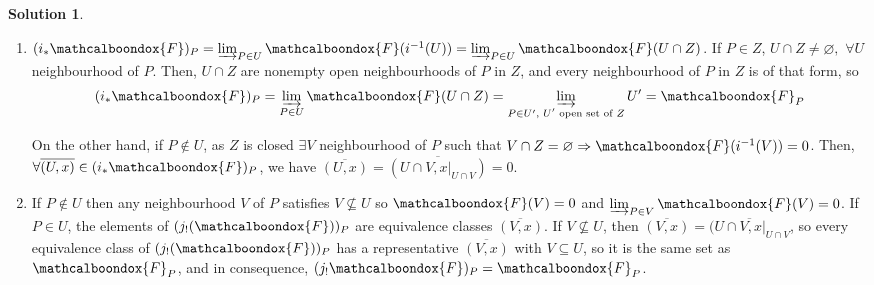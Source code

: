 \documentclass[12pt]{article}
\newcommand{\imp}{\ensuremath{\Rightarrow}}
\theoremstyle{definition}
\newtheorem*{sol}{Solution}
\newcommand{\sF}{\ensuremath{\mathcalboondox{F}}}
\begin{document}
\begin{sol}
	\begin{enumerate}[label=\alph*)]
		\item $(i_{*}\sF)_P = \varinjlim_{P \in U} \sF(i^{-1}(U)) = \varinjlim_{P \in U} \sF(U \cap Z)$. If $P \in Z$, $U \cap Z \neq \varnothing, \, \, \forall U$ neighbourhood of $P$. Then, $U \cap Z$ are nonempty open neighbourhoods of $P$ in $Z$, and every neighbourhood of $P$ in $Z$ is of that form, so 
		\[
			(i_{*}\sF)_P = \varinjlim_{P \in U} \sF(U \cap Z) = \varinjlim_{P \in U', \text{ $U'$ open set of $Z$}} U' = \sF_P
		\]

		On the other hand, if $P \notin U$, as $Z$ is closed $\exists V$ neighbourhood of $P$ such that $V \cap Z = \varnothing \imp \sF(i^{-1}(V)) = 0$. Then, $\forall \overline{(U,x)} \in (i_{*}\sF)_P$, we have $\overline{(U,x)} = \overline{(U \cap V, x|_{U\cap V})} = 0$.

		\item If $P \notin U$ then any neighbourhood $V$ of $P$ satisfies $V \not\subseteq U$ so $\sF(V) = 0$ and $\varinjlim_{P \in V} \sF(V) = 0$. If $P \in U$, the elements of $(j_{!}(\sF))_P$ are equivalence classes $\overline{(V,x)}$. If $V \not\subseteq U$, then $\overline{(V,x)} = \overline{(U \cap V, x|_{U\cap V}}$, so every equivalence class of $(j_{!}(\sF))_P$ has a representative $\overline{(V,x)}$ with $V \subseteq U$, so it is the same set as $\sF_P$, and in consequence, $(j_{!}\sF)_P = \sF_P$.


\end{enumerate}
\end{sol}
\end{document}
